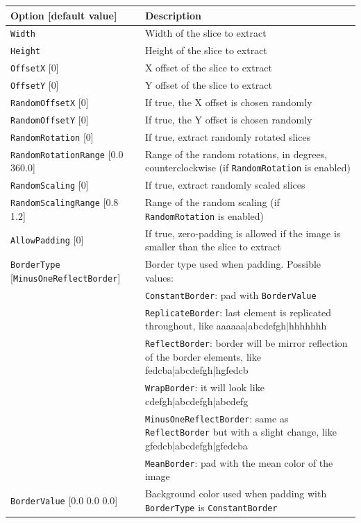 \documentclass[a4paper,11pt,oneside]{article}
\begin{document}
\begin{center}
 \begin{tabular}{| p{5cm} | p{10cm} | }
 \hline
 Option [default value] & Description\\
 \hline\hline
  \cellcolor{requiredcolor}\lstinline!Width! & Width of the slice to extract \\
  \cellcolor{requiredcolor}\lstinline!Height! & Height of the slice to
  extract \\
  \lstinline!OffsetX! [0] & X offset of the slice to extract \\
  \lstinline!OffsetY! [0] & Y offset of the slice to extract \\
  \lstinline!RandomOffsetX! [0] & If true, the X offset is chosen randomly \\
  \lstinline!RandomOffsetY! [0] & If true, the Y offset is chosen randomly \\
  \lstinline!RandomRotation! [0] & If true, extract randomly rotated slices \\
  \lstinline!RandomRotationRange! [0.0 360.0] & Range of the random rotations, in degrees, counterclockwise (if \lstinline!RandomRotation! is enabled) \\
  \lstinline!RandomScaling! [0] & If true, extract randomly scaled slices \\
  \lstinline!RandomScalingRange! [0.8 1.2] & Range of the random scaling (if \lstinline!RandomRotation! is enabled) \\
  \lstinline!AllowPadding! [0] & If true, zero-padding is allowed if the image
  is smaller than the slice to extract \\
  \lstinline!BorderType! [\lstinline!MinusOneReflectBorder!] & Border type
  used when padding. Possible values: \\
   & \lstinline!ConstantBorder!: pad with \lstinline!BorderValue! \\
   & \lstinline!ReplicateBorder!: last element is replicated throughout, like aaaaaa|abcdefgh|hhhhhhh \\
   & \lstinline!ReflectBorder!: border will be mirror reflection of the border elements, like fedcba|abcdefgh|hgfedcb \\
   & \lstinline!WrapBorder!: it will look like cdefgh|abcdefgh|abcdefg \\
   & \lstinline!MinusOneReflectBorder!: same as \lstinline!ReflectBorder! but with a slight change, like gfedcb|abcdefgh|gfedcba \\
   & \lstinline!MeanBorder!: pad with the mean color of the image \\
   \lstinline!BorderValue! [0.0 0.0 0.0] & Background color
   used when padding with \lstinline!BorderType! is \lstinline!ConstantBorder! \\
 \hline
\end{tabular}
\end{center}
\end{document}
